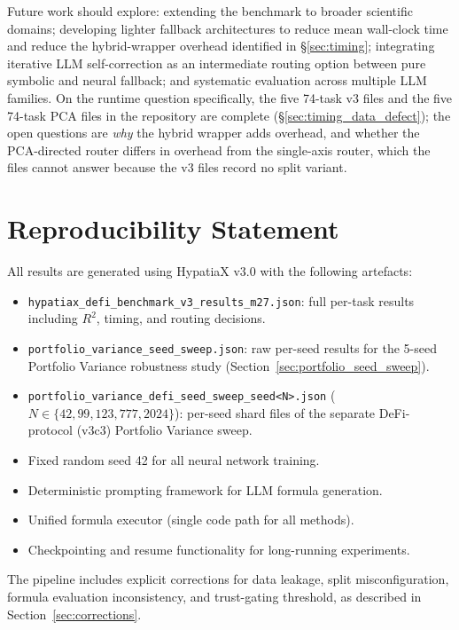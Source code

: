 \documentclass[twoside,11pt]{article}
\newcommand{\Rsq}{R^{2}}
\begin{document}
Future work should explore: extending the benchmark to broader scientific domains;
developing lighter fallback architectures to reduce mean wall-clock time and
reduce the hybrid-wrapper overhead identified in
\S\ref{sec:timing};
integrating iterative LLM self-correction as an intermediate routing option between
pure symbolic and neural fallback; and systematic evaluation across multiple LLM
families. On the runtime question specifically, the five 74-task v3 files and the five 74-task PCA files in
the repository are complete (\S\ref{sec:timing_data_defect}); the open
questions are \emph{why} the hybrid wrapper adds overhead, and whether the
PCA-directed router differs in overhead from the single-axis router, which
the files cannot answer because the v3 files record no split variant.

\section*{Reproducibility Statement}

All results are generated using HypatiaX v3.0 with the following artefacts:
\begin{itemize}
  \item \texttt{hypatiax\_defi\_benchmark\_v3\_results\_m27.json}: full per-task
    results including $\Rsq$, timing, and routing decisions.
  \item \texttt{portfolio\_variance\_seed\_sweep.json}: raw per-seed results for
    the 5-seed Portfolio Variance robustness study (Section~\ref{sec:portfolio_seed_sweep}).
  \item \texttt{portfolio\_variance\_defi\_seed\_sweep\_seed<N>.json} ($N\in\{42,99,123,777,2024\}$):
    per-seed shard files of the separate DeFi-protocol (v3c3) Portfolio Variance sweep.
  \item Fixed random seed 42 for all neural network training.
  \item Deterministic prompting framework for LLM formula generation.
  \item Unified formula executor (single code path for all methods).
  \item Checkpointing and resume functionality for long-running experiments.
\end{itemize}
The pipeline includes explicit corrections for data leakage, split misconfiguration,
formula evaluation inconsistency, and trust-gating threshold, as described in
Section~\ref{sec:corrections}.
\end{document}
